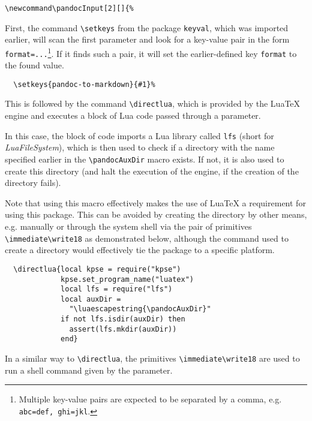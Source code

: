 \documentclass[
  digital,     %
  oneside,     %
  nosansbold,  %
  nocolorbold, %
  lof,         %
  nolot,       %
]{fithesis4}
\newcommand\macro[1]{\texttt{\textbackslash{}{#1}}}
\begin{document}
\noindent
\lstset{language=[LaTeX]TeX}
\begin{lstlisting}
\newcommand\pandocInput[2][]{%
\end{lstlisting}

\noindent
First, the command \macro{setkeys} from the package \texttt{keyval}, which was imported earlier, will scan the first parameter and look for a key-value pair in the form \texttt{format=...}\footnote{Multiple key-value pairs are expected to be separated by a comma, e.g. \texttt{abc=def,~ghi=jkl}.}. If it finds such a pair, it will set the earlier-defined key \texttt{format} to the found value.

\noindent
\lstset{language=[LaTeX]TeX}
\begin{lstlisting}
  \setkeys{pandoc-to-markdown}{#1}%
\end{lstlisting}

\noindent
This is followed by the command \macro{directlua}, which is provided by the Lua\TeX{} engine and executes a block of Lua code passed through a parameter.

In this case, the block of code imports a Lua library called \texttt{lfs} (short for \emph{LuaFileSystem}), which is then used to check if a directory with the name specified earlier in the \macro{pandocAuxDir} macro exists. If not, it is also used to create this directory (and halt the execution of the engine, if the creation of the directory fails).

Note that using this macro effectively makes the use of Lua\TeX{} a requirement for using this package. This can be avoided by creating the directory by other means, e.g. manually or through the system shell via the pair of primitives \macro{immediate}\macro{write18} as demonstrated below, although the command used to create a directory would effectively tie the package to a specific platform.

\noindent
\lstset{language=[LaTeX]TeX}
\begin{lstlisting}
  \directlua{local kpse = require("kpse")
             kpse.set_program_name("luatex")
             local lfs = require("lfs")
             local auxDir =
               "\luaescapestring{\pandocAuxDir}"
             if not lfs.isdir(auxDir) then
               assert(lfs.mkdir(auxDir))
             end}
\end{lstlisting}

\noindent
In a similar way to \macro{directlua}, the primitives \macro{immediate}\macro{write18} are used to run a shell command given by the parameter.
\end{document}
